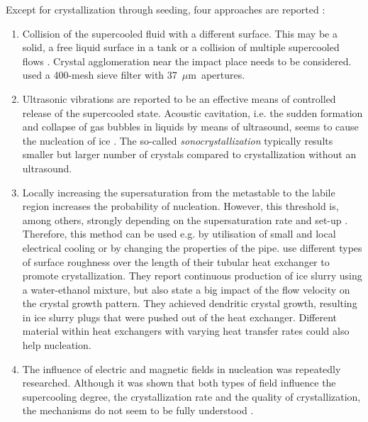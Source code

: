 \noindent Except for crystallization through seeding, four approaches are reported \citep{wang_investigation_2016, zhang_overview_2012}:

\begin{enumerate}
  \item Collision of the supercooled fluid with a different surface. This may be a solid, a free liquid surface in a tank or a collision of multiple supercooled flows \citep{bedecarrats_ice_2010}. Crystal agglomeration near the impact place needs to be considered. \cite{wang_investigation_2016} used a 400-mesh sieve filter with \SI{37}{$\mu$m} apertures.  
  \item Ultrasonic vibrations are reported to be an effective means of controlled release of the supercooled state. Acoustic cavitation, i.e. the sudden formation and collapse of gas bubbles in liquids by means of ultrasound, seems to cause the nucleation of ice \citep{baillon_28_2015}. The so-called \emph{sonocrystallization} typically results smaller but larger number of crystals compared to crystallization without an ultrasound. 
  \item Locally increasing the supersaturation from the metastable to the labile region increases the probability of nucleation. However, this threshold is, among others, strongly depending on the supersaturation rate and set-up \citep{mullin_crystallization_2001}. Therefore, this method can be used e.g. by utilisation of small and local electrical cooling or by changing the properties of the pipe. \cite{le_bail_ice_2015} use different types of surface roughness over the length of their tubular heat exchanger to promote crystallization. They report continuous production of ice slurry using a water-ethanol mixture, but also state a big impact of the flow velocity on the crystal growth pattern. They achieved dendritic crystal growth, resulting in ice slurry plugs that were pushed out of the heat exchanger. Different material within heat exchangers with varying heat transfer rates could also help nucleation.
  \item The influence of electric and magnetic fields in nucleation was repeatedly researched. Although it was shown that both types of field influence the supercooling degree, the crystallization rate and the quality of crystallization, the mechanisms do not seem to be fully understood \citep{dalvi-isfahan_review_2017}.
\end{enumerate}



